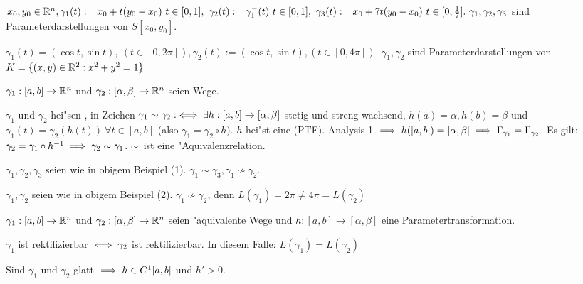 \documentclass[a4paper,twoside,DIV15,BCOR12mm]{scrbook}
\begin{document}
\begin{beispiele}
\item $x_0, y_0\in\MdR^n, \gamma_1(t):=x_0+t(y_0-x_0)\ t\in[0,1],\ \gamma_2(t):=\gamma_1^-(t)\ t\in[0,1],\ \gamma_3(t):=x_0+7t(y_0-x_0)\ t\in[0,\frac{1}{7}].\ \gamma_1,\gamma_2,\gamma_3$ sind Parameterdarstellungen von $S[x_0, y_0]$.
\item $\gamma_1(t)=(\cos t, \sin t),\ (t\in [0,2\pi]), \gamma_2(t):=(\cos t, \sin t), (t\in[0,4\pi])$. $\gamma_1, \gamma_2$ sind Parameterdarstellungen von $K=\{(x,y)\in\mathbb{R}^2: x^2+y^2=1\}.$
\end{beispiele}

\begin{definition*}
$\gamma_1:[a,b]\to\mathbb{R}^n$ und $\gamma_2:[\alpha,\beta]\to\mathbb{R}^n$ seien Wege.

$\gamma_1$ und $\gamma_2$ hei"sen , in Zeichen $\gamma_1\sim\gamma_2:\iff\exists h:[a,b]\to[\alpha, \beta]$ stetig und streng wachsend, $h(a)=\alpha, h(b)=\beta$ und $\gamma_1(t)=\gamma_2(h(t))\ \forall t\in[a,b]$ (also $\gamma_1=\gamma_2\circ h)$. $h$ hei"st eine  (PTF). Analysis 1 $\implies h([a,b])=[\alpha,\beta]\implies \Gamma_{\gamma_1}=\Gamma_{\gamma_2}$.
Es gilt: $\gamma_2=\gamma_1\circ h^{-1}\implies \gamma_2\sim\gamma_1$. \glqq$\sim$\grqq\ ist eine "Aquivalenzrelation.
\end{definition*}

\begin{beispiele}
\item $\gamma_1, \gamma_2, \gamma_3$ seien wie in obigem Beispiel (1). $\gamma_1\sim\gamma_3, \gamma_1\nsim\gamma_2$.
\item $\gamma_1, \gamma_2$ seien wie in obigem Beispiel (2). $\gamma_1\nsim\gamma_2$, denn $L(\gamma_1)=2\pi\ne 4\pi=L(\gamma_2)$
\end{beispiele}

\begin{satz}
$\gamma_1:[a,b]\to\mathbb{R}^n$ und $\gamma_2:[\alpha,\beta]\to\mathbb{R}^n$ seien "aquivalente Wege und $h:[a,b]\to[\alpha,\beta]$ eine Parametertransformation.
\begin{liste}
\item $\gamma_1$ ist rektifizierbar $\iff \gamma_2$ ist rektifizierbar. In diesem Falle: $L(\gamma_1)=L(\gamma_2)$
\item Sind $\gamma_1$ und $\gamma_2$ glatt $\implies h\in C^1[a,b]$ und $h'>0$.
\end{liste}
\end{satz}
\end{document}

